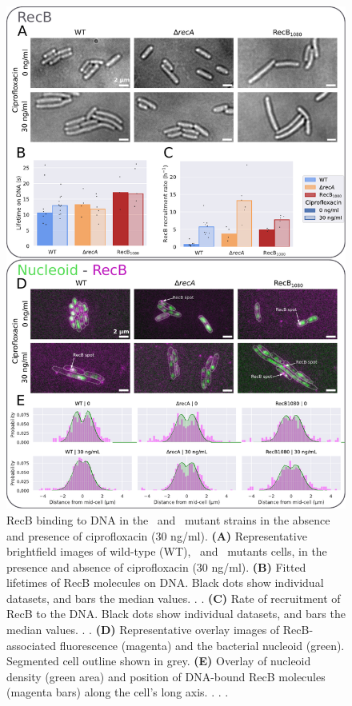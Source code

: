 \begin{figure}[htbp]
    \centering
    \includegraphics[width=.75\textwidth]{Figures/Fig4_mutants.pdf}
    \caption{RecB binding to DNA in the \dreca\ and \teneighty\ mutant strains in the absence and presence of ciprofloxacin (30 ng/ml). \textbf{(A)} Representative brightfield images of wild-type (WT), \dreca\ and \teneighty\ mutants cells, in the presence and absence of ciprofloxacin (30 ng/ml). \textbf{(B)} Fitted lifetimes of RecB molecules on DNA. Black dots show individual datasets, and bars the median values. . . \textbf{(C)} Rate of recruitment of RecB to the DNA. Black dots show individual datasets, and bars the median values. . . \textbf{(D)} Representative overlay images of RecB-associated fluorescence (magenta) and the bacterial nucleoid (green). Segmented cell outline shown in grey. \textbf{(E)} Overlay of nucleoid density (green area) and position of DNA-bound RecB molecules (magenta bars) along the cell's long axis. . . .}
    \label{Fig:mutants}
\end{figure}

